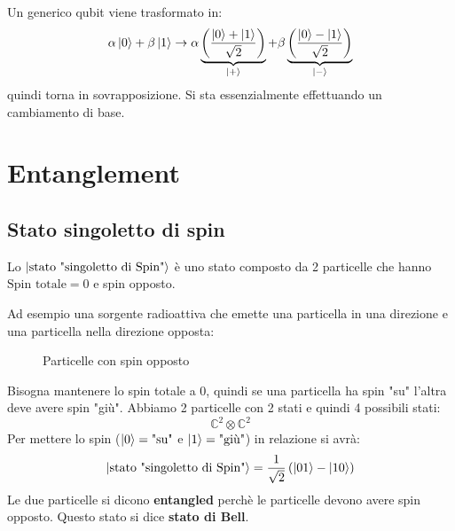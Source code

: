 \documentclass[a4paper]{article}
\begin{document}
\vspace{1em}
\noindent
Un generico qubit viene trasformato in:
\[
  \alpha \ket{0} + \beta \ket{1} \to 
  \alpha \underbrace{\left( \frac{\ket{0} + \ket{1}}{\sqrt{2} } \right)}_{\ket{+}} +
  \beta \underbrace{\left( \frac{\ket{0} - \ket{1}}{\sqrt{2} } \right)}_{\ket{-}}
\] 
quindi torna in sovrapposizione. Si sta essenzialmente effettuando un cambiamento di base.

\section{Entanglement}
\subsection{Stato singoletto di spin}
Lo \( \ket{\text{stato "singoletto di Spin"}} \) è uno stato composto da 2 particelle
che hanno \( \text{Spin totale} = 0 \)  e spin opposto.

\vspace{1em}
\noindent
Ad esempio una sorgente
radioattiva che emette una particella in una direzione e una particella nella direzione
opposta:
\begin{figure}[H]
  \centering
  \caption{Particelle con spin opposto}
\end{figure}
\noindent
Bisogna mantenere lo spin totale a 0, quindi se una particella ha spin "su" l'altra
deve avere spin "giù". Abbiamo 2 particelle con 2 stati e quindi 4 possibili stati:
\[
  \mathbb{C}^2 \otimes \mathbb{C}^2
\] 
Per mettere lo spin (\( \ket{0} = \text{"su"} \) e \( \ket{1} = \text{"giù"} \)) in relazione si avrà:
\[
  \ket{\text{stato "singoletto di Spin"}} =
  \frac{1}{\sqrt{2}} \left( \ket{01} - \ket{10} \right)
\] 
Le due particelle si dicono \textbf{entangled} perchè le particelle devono avere spin
opposto. Questo stato si dice \textbf{stato di Bell}.
\end{document}
